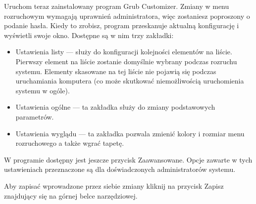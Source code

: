 Uruchom teraz zainstalowany program Grub Customizer. Zmiany w menu rozruchowym wymagają uprawnień administratora, więc zostaniesz poproszony o podanie hasła. Kiedy to zrobisz, program przeskanuje aktualną konfigurację i wyświetli swoje okno. Dostępne są w nim trzy zakładki:
\begin{itemize}
\item \textcolor{ubuntu_orange}{Ustawienia listy} --- służy do konfiguracji kolejności elementów na liście. Pierwszy element na liście zostanie domyślnie wybrany podczas rozruchu systemu. Elementy skasowane na tej liście nie pojawią się podczas uruchamiania komputera (co może skutkować niemożliwością uruchomienia systemu w ogóle).
\item \textcolor{ubuntu_orange}{Ustawienia ogólne} --- ta zakładka służy do zmiany podstawowych parametrów.
\item \textcolor{ubuntu_orange}{Ustawienia wyglądu} --- ta zakładka pozwala zmienić kolory i rozmiar menu rozruchowego a także wgrać tapetę.
\end{itemize}

W programie dostępny jest jeszcze przycisk \textcolor{ubuntu_orange}{Zaawansowane}. Opcje zawarte w tych ustawieniach przeznaczone są dla doświadczonych administratorów systemu.

Aby zapisać wprowadzone przez siebie zmiany kliknij na przycisk \textcolor{ubuntu_orange}{Zapisz} znajdujący się na górnej belce narzędziowej.